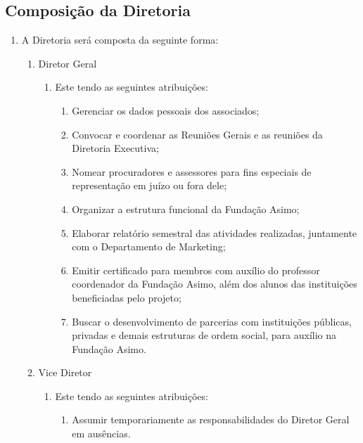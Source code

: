     \subsection{Composição da Diretoria}
    \begin{enumerate}
       \item A Diretoria será composta da seguinte forma:
       \begin{enumerate}
           \item Diretor Geral
           \begin{enumerate}
               \item Este tendo as seguintes atribuições:
               \begin{enumerate}
               \item  Gerenciar os dados pessoais dos associados;
               \item  Convocar e coordenar as Reuniões Gerais e as reuniões da Diretoria Executiva;
               \item  Nomear procuradores e assessores para fins especiais de representação em juízo ou fora dele;
               \item  Organizar a estrutura funcional da Fundação Asimo;
               \item  Elaborar relatório semestral das atividades realizadas, juntamente com o Departamento de Marketing;
               \item  Emitir certificado para membros com auxílio do professor coordenador da Fundação Asimo, além dos alunos das instituições beneficiadas pelo projeto;
               \item  Buscar o desenvolvimento de parcerias com instituições públicas, privadas e demais estruturas de ordem social, para auxílio na Fundação Asimo.
               \end{enumerate}
           \end{enumerate}
           \item Vice Diretor
                \begin{enumerate}
                    \item Este tendo as seguintes atribuições:
                    \begin{enumerate}
                        \item Assumir temporariamente as responsabilidades do Diretor Geral em ausências.
                    \end{enumerate}
                \end{enumerate}           
           

\end{enumerate}
\end{enumerate}
